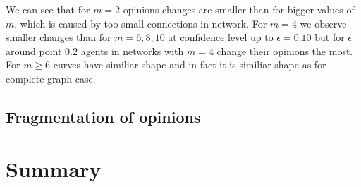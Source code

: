 \documentclass{article}
\begin{document}
We can see that for $m=2$ opinions changes are smaller than for bigger values of $m$, which is caused by too small connections in network. For $m=4$ we observe smaller changes than for $m=6,8,10$ at confidence level up to $\epsilon=0.10$ but for $\epsilon$ around point $0.2$ agents in networks with $m=4$ change their opinions the most. For $m \geq 6$ curves have similiar shape and in fact it is similiar shape as for complete graph case.

\subsection{Fragmentation of opinions}

\section{Summary}
\indent
\end{document}
